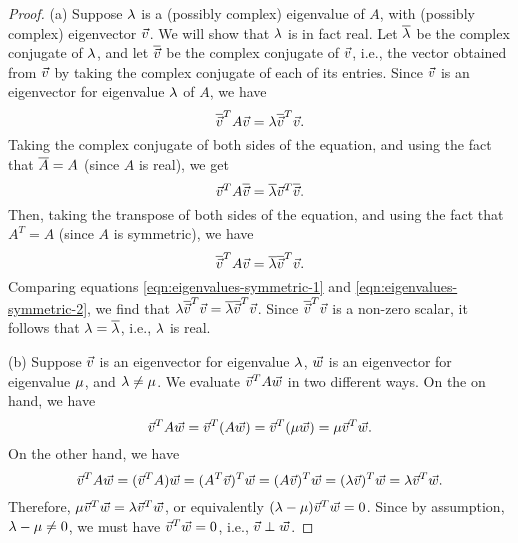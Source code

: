\documentclass{ximera}
\begin{document}
\begin{proof}
  (a) Suppose $\lambda$ is a (possibly complex) eigenvalue of $A$,
  with (possibly complex) eigenvector $\vec{v}$. We will show that
  $\lambda$ is in fact real. Let $\overline{\lambda}$ be the
  complex conjugate of $\lambda$, and let $\overline{\vec{v}}$ be
  the complex conjugate of $\vec{v}$, i.e., the vector obtained from
  $\vec{v}$ by taking the complex conjugate of each of its entries.
  Since $\vec{v}$ is an eigenvector for eigenvalue $\lambda$ of
  $A$, we have
  \begin{equation}\label{eqn:eigenvalues-symmetric-1}
    \overline{\vec{v}}^T A\vec{v}
    = \lambda \overline{\vec{v}}^T\vec{v}.
  \end{equation}
  Taking the complex conjugate of both sides of the equation, and
  using the fact that $\overline{A}=A$ (since $A$ is
  real), we get
  \begin{equation}
    \vec{v}^T A\overline{\vec{v}}
    = \overline{\lambda} \vec{v}^T\overline{\vec{v}}.
  \end{equation}
  Then, taking the transpose of both sides of the equation, and using
  the fact that $A^T=A$ (since $A$ is symmetric), we have
  \begin{equation}\label{eqn:eigenvalues-symmetric-2}
    \overline{\vec{v}}^T A\vec{v}
    = \overline{\lambda} \overline{\vec{v}}^T\vec{v}.
  \end{equation}
  Comparing equations {\eqref{eqn:eigenvalues-symmetric-1}} and
  {\eqref{eqn:eigenvalues-symmetric-2}}, we find that
  $\lambda \overline{\vec{v}}^T\vec{v} = \overline{\lambda}
  \overline{\vec{v}}^T\vec{v}$. Since
  $\overline{\vec{v}}^T\vec{v}$ is a non-zero scalar, it follows
  that $\lambda = \overline{\lambda}$, i.e., $\lambda$ is real.

  \noindent
  (b) Suppose $\vec{v}$ is an eigenvector for eigenvalue
  $\lambda$, $\vec{w}$ is an eigenvector for eigenvalue
  $\mu$, and $\lambda\neq\mu$.  We evaluate
  $\vec{v}^TA\vec{w}$ in two different ways. On the on hand, we have
  \begin{equation*}
    \vec{v}^TA\vec{w}
    = \vec{v}^T(A\vec{w})
    = \vec{v}^T(\mu\vec{w})
    = \mu \vec{v}^T\vec{w}.
  \end{equation*}
  On the other hand, we have
  \begin{equation*}
    \vec{v}^TA\vec{w}
    = (\vec{v}^TA)\vec{w}
    = (A^T\vec{v})^T\vec{w}
    = (A\vec{v})^T\vec{w}
    = (\lambda\vec{v})^T\vec{w}
    = \lambda\vec{v}^T\vec{w}.
  \end{equation*}
  Therefore,
  $\mu\vec{v}^T\vec{w} = \lambda\vec{v}^T\vec{w}$, or
  equivalently $(\lambda - \mu)\vec{v}^T\vec{w} =
  0$. Since by assumption, $\lambda - \mu\neq 0$, we must
  have $\vec{v}^T\vec{w} = 0$, i.e., $\vec{v}\perp\vec{w}$.
\end{proof}
\end{document}
